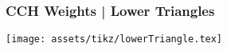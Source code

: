 \begin{frame}
    \frametitle{CCH Weights | Lower Triangles}
    \texttt{[image: assets/tikz/lowerTriangle.tex]}
\end{frame}
